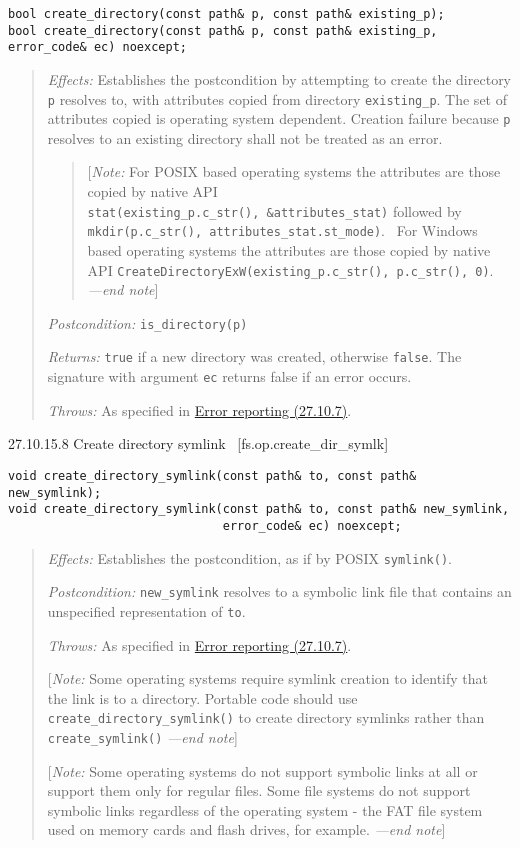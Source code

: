 \begin{verbatim}
bool create_directory(const path& p, const path& existing_p);
bool create_directory(const path& p, const path& existing_p, error_code& ec) noexcept;
\end{verbatim}

\begin{quote}
\emph{Effects:} Establishes the postcondition by attempting to create
the directory \texttt{p} resolves to, with attributes copied from
directory \texttt{existing\_p}. The set of attributes copied is
operating system dependent. Creation failure because \texttt{p} resolves
to an existing directory shall not be treated as an error.

\begin{quote}
{[}\emph{Note:} For POSIX based operating systems the attributes are
those copied by native API
\texttt{stat(existing\_p.c\_str(),\ \&attributes\_stat)} followed by
\texttt{mkdir(p.c\_str(),\ attributes\_stat.st\_mode)}.~ For Windows
based operating systems the attributes are those copied by native API
\texttt{CreateDirectoryExW(existing\_p.c\_str(),\ p.c\_str(),\ 0)}.~
\emph{---end note}{]}
\end{quote}

\emph{Postcondition:} \texttt{is\_directory(p)}

\emph{Returns:} \texttt{true} if a new directory was created, otherwise
\texttt{false}. The signature with argument \texttt{ec} returns false if
an error occurs.

\emph{Throws:} As specified in \hyperref[Error-reporting]{Error
reporting (27.10.7)}.
\end{quote}

27.10.15.8 Create directory symlink~ {[}fs.op.create\_dir\_symlk{]}

\begin{verbatim}
void create_directory_symlink(const path& to, const path& new_symlink);
void create_directory_symlink(const path& to, const path& new_symlink,
                              error_code& ec) noexcept;
\end{verbatim}

\begin{quote}
\emph{Effects:} Establishes the postcondition, as if by POSIX
\texttt{symlink()}.

\emph{Postcondition:} \texttt{new\_symlink} resolves to a symbolic link
file that contains an unspecified representation of \texttt{to}.

\emph{Throws:} As specified in \hyperref[Error-reporting]{Error
reporting (27.10.7)}.

{[}\emph{Note:} Some operating systems require symlink creation to
identify that the link is to a directory. Portable code should use
\texttt{create\_directory\_symlink()} to create directory symlinks
rather than \texttt{create\_symlink()} \emph{---end note}{]}

{[}\emph{Note:} Some operating systems do not support symbolic links at
all or support them only for regular files. Some file systems do not
support symbolic links regardless of the operating system - the FAT file
system used on memory cards and flash drives, for example. \emph{---end
note}{]}
\end{quote}

